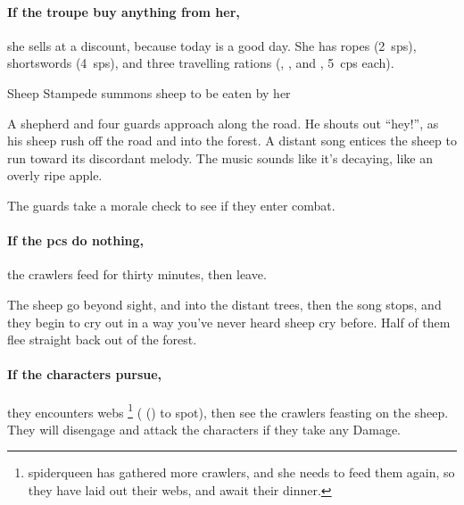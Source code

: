 \paragraph{If the troupe buy anything from her,}
she sells at a discount, because today is a good day.
She has ropes (2~\glspl{sp}), shortswords (4~\glspl{sp}), and three travelling \glspl{ration} (\rations, \rations, and \rations, 5~\glspl{cp} each).


{Sheep Stampede}%
{ summons sheep to be eaten by her }%

\begin{boxtext}
  A shepherd and four \glspl{guard} approach along the road.
  He shouts out ``hey!'', as his sheep rush off the road and into the forest.
  A distant song entices the sheep to run toward its discordant melody.
  The music sounds like it's decaying, like an overly ripe apple.
\end{boxtext}

The \glspl{guard} take a morale check to see if they enter combat.%


\paragraph{If the \glspl{pc} do nothing,}
the \glspl{crawler} feed for thirty minutes, then leave.

\begin{boxtext}
  The sheep go beyond sight, and into the distant trees, then the song stops, and they begin to cry out in a way you've never heard sheep cry before.
  Half of them flee straight back out of the forest.
\end{boxtext}

\paragraph{If the characters pursue,}
they encounters webs%
\footnote{\Gls{spiderqueen} has gathered more \glspl{crawler}, and she needs to feed them again, so they have laid out their webs, and await their dinner.}
( (\tn[9]) to spot), then see the \glspl{crawler} feasting on the sheep.
They will disengage and attack the characters if they take any Damage.

